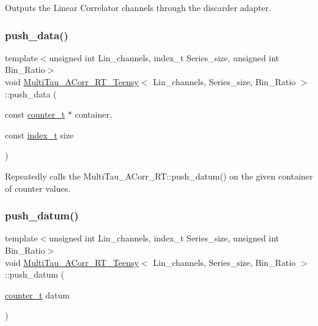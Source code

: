 Outputs the Linear Correlator channels through the discarder adapter. 

\mbox{\label{classMultiTau__ACorr__RT__Teensy_ae36ab4fb6f646d068e638ab7e4ec9da8}} 
\subsubsection{\texorpdfstring{push\+\_\+data()}{push\_data()}}
{\footnotesize\ttfamily template$<$unsigned int Lin\+\_\+channels, index\+\_\+t Series\+\_\+size, unsigned int Bin\+\_\+\+Ratio$>$ \\
void \hyperlink{classMultiTau__ACorr__RT__Teensy}{Multi\+Tau\+\_\+\+A\+Corr\+\_\+\+R\+T\+\_\+\+Teensy}$<$ Lin\+\_\+channels, Series\+\_\+size, Bin\+\_\+\+Ratio $>$\+::push\+\_\+data (\begin{DoxyParamCaption}\item[{const \hyperlink{types_8hpp_ac89ac912f524b3e3fa3720ea55fec966}{counter\+\_\+t} $\ast$}]{container,  }\item[{const \hyperlink{types_8hpp_a7c40bb931c31595ed6308605f4537447}{index\+\_\+t}}]{size }\end{DoxyParamCaption})\hspace{0.3cm}{\ttfamily [inline]}}



Repeatedly calls the Multi\+Tau\+\_\+\+A\+Corr\+\_\+\+R\+T\+::push\+\_\+datum() on the given container of counter values. 

\mbox{\label{classMultiTau__ACorr__RT__Teensy_a1ad6126310c987f53a0ec7ab3ae03a12}} 
\subsubsection{\texorpdfstring{push\+\_\+datum()}{push\_datum()}}
{\footnotesize\ttfamily template$<$unsigned int Lin\+\_\+channels, index\+\_\+t Series\+\_\+size, unsigned int Bin\+\_\+\+Ratio$>$ \\
void \hyperlink{classMultiTau__ACorr__RT__Teensy}{Multi\+Tau\+\_\+\+A\+Corr\+\_\+\+R\+T\+\_\+\+Teensy}$<$ Lin\+\_\+channels, Series\+\_\+size, Bin\+\_\+\+Ratio $>$\+::push\+\_\+datum (\begin{DoxyParamCaption}\item[{\hyperlink{types_8hpp_ac89ac912f524b3e3fa3720ea55fec966}{counter\+\_\+t}}]{datum }\end{DoxyParamCaption})\hspace{0.3cm}{\ttfamily [inline]}}



